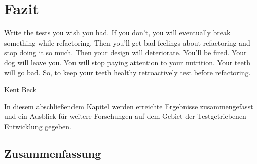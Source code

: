 \chapter{Fazit}
\label{sec:fazit}
\epigraph{Write the tests you wish you had. If you don't, you will eventually break something while refactoring. Then you'll get bad feelings about refactoring and stop doing it so much. Then your design will deteriorate. You'll be fired. Your dog will leave you. You will stop paying attention to your nutrition. Your teeth will go bad. So, to keep your teeth healthy retroactively test before refactoring.}{Kent Beck \citep{beck_test_2002}}

In diesem abschließendem Kapitel werden erreichte Ergebnisse zusammengefasst und ein Ausblick für weitere Forschungen auf dem Gebiet der Testgetriebenen Entwicklung gegeben.

\section{Zusammenfassung}
